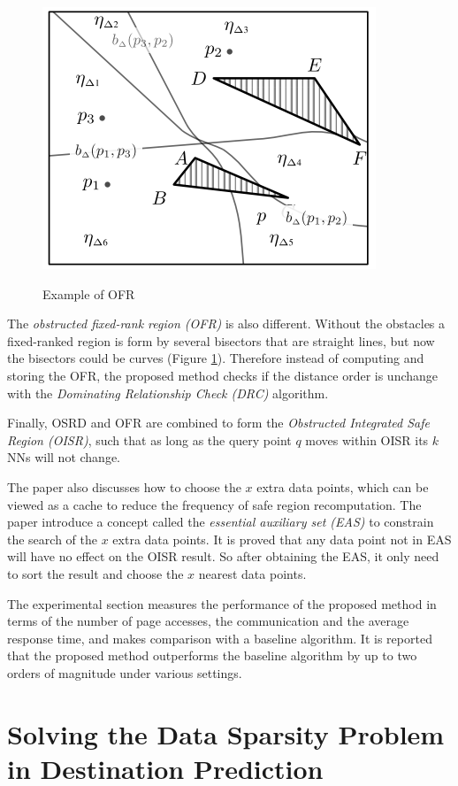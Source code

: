 \documentclass[paper=a4, fontsize=18pt]{article} %
\numberwithin{equation}{section} %
\numberwithin{figure}{section} %
\numberwithin{table}{section} %
\begin{document}
\begin{figure}[h]
  \centering
  \includegraphics[width=.5\linewidth]{8_8_oisr3.png}\\
  \caption{Example of OFR}\label{fig:oisr3}
\end{figure}

The \emph{obstructed fixed-rank region (OFR)} is also different. Without the obstacles a fixed-ranked region is form by several bisectors that are straight lines, but now the bisectors could be curves (Figure \ref{fig:oisr3}). Therefore instead of computing and storing the OFR, the proposed method checks if the distance order is unchange with the \emph{Dominating Relationship Check (DRC)} algorithm.

Finally, OSRD and OFR are combined to form the \emph{Obstructed Integrated Safe Region (OISR)}, such that as long as the query point $q$ moves within OISR its $k$NNs will not change.

The paper also discusses how to choose the $x$ extra data points, which can be viewed as a cache to reduce the frequency of safe region recomputation. The paper introduce a concept called the \emph{essential auxiliary set (EAS)} to constrain the search of the $x$ extra data points. It is proved that any data point not in EAS will have no effect on the OISR result. So after obtaining the EAS, it only need to sort the result and choose the $x$ nearest data points.

The experimental section measures the performance of the proposed method in terms of the number of page accesses, the communication and the average response time, and makes comparison with a baseline algorithm. It is reported that the proposed method outperforms the baseline algorithm by up to two orders of magnitude under various settings.

\section{Solving the Data Sparsity Problem in Destination Prediction \cite{XQX0HL15}}
\end{document}
